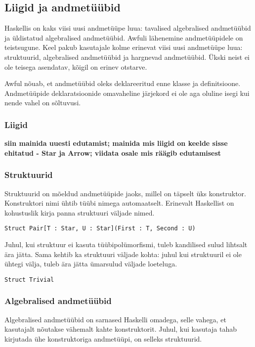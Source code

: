\documentclass[12pt]{article}
\newcommand\markus[1]{\textcolor{roheline}{\textbf{#1}}}
\begin{document}
    \subsection{Liigid ja andmetüübid}
      Haskellis on kaks viisi uusi andmetüüpe luua: tavalised algebralised andmetüübid ja üldistatud algebralised andmetüübid. Awfuli lähenemine andmetüüpidele on teistsugune. Keel pakub kasutajale kolme erinevat viisi uusi andmetüüpe luua: struktuurid, algebralised andmetüübid ja hargnevad andmetüübid. Ükski neist ei ole teisega asendatav, kõigil on erinev otstarve.

      Awful nõuab, et andmetüübid oleks deklareeritud enne klasse ja definitsioone. Andmetüüpide deklaratsioonide omavaheline järjekord ei ole aga oluline isegi kui nende vahel on sõltuvusi.
      \subsubsection{Liigid}
        \markus{siin mainida uuesti edutamist; mainida mis liigid on keelde sisse ehitatud - Star ja Arrow; viidata osale mis räägib edutamisest}
      \subsubsection{Struktuurid}
        Struktuurid on mõeldud andmetüüpide jaoks, millel on täpselt üks konstruktor. Konstruktori nimi ühtib tüübi nimega automaatselt. Erinevalt Haskellist on kohustuslik kirja panna struktuuri väljade nimed.

        \begin{verbatim}Struct Pair[T : Star, U : Star](First : T, Second : U)\end{verbatim}

        Juhul, kui struktuur ei kasuta tüübipolümorfismi, tuleb kandilised sulud lihtsalt ära jätta. Sama kehtib ka struktuuri väljade kohta: juhul kui struktuuril ei ole ühtegi välja, tuleb ära jätta ümarsulud väljade loeteluga.

        \begin{verbatim}Struct Trivial\end{verbatim}

      \subsubsection{Algebralised andmetüübid}
        Algebralised andmetüübid on sarnased Haskelli omadega, selle vahega, et kasutajalt nõutakse vähemalt kahte konstruktorit. Juhul, kui kasutaja tahab kirjutada ühe konstruktoriga andmetüüpi, on selleks struktuurid.
\end{document}
